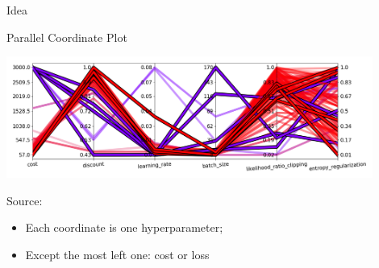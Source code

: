 \begin{frame}[c,fragile]{Idea}

\begin{center}
\scalebox{0.9}{
	
}
\end{center}


\end{frame}
\begin{frame}[c]{Parallel Coordinate Plot }

\centering
\includegraphics[width=0.9\textwidth]{images/parallel_coordinates_linear_cost_log_sampling_100}
\begin{flushright}
	Source:  
\end{flushright}

\begin{itemize}
	\item Each coordinate is one hyperparameter; 
	\item Except the most left one: cost or loss
\end{itemize}

\end{frame}

